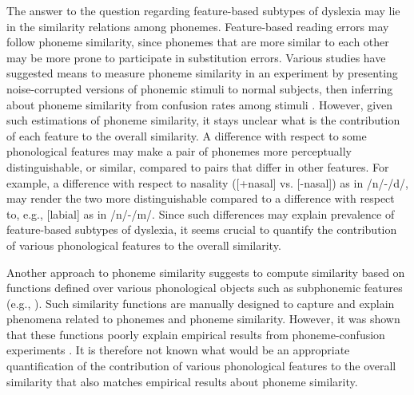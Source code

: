 The answer to the question regarding feature-based subtypes of dyslexia may lie in the similarity relations among phonemes. Feature-based reading errors may follow phoneme similarity, since phonemes that are more similar to each other may be more prone to participate in substitution errors. Various studies have suggested means to measure phoneme similarity in an experiment \citep{NicelyMiller1955, Luce1987, cutler2004patterns} by presenting noise-corrupted versions of phonemic stimuli to normal subjects, then inferring about phoneme similarity from confusion rates among stimuli \citep{Tversky1977}. However, given such estimations of phoneme similarity, it stays unclear what is the contribution of each feature to the overall similarity. A difference with respect to some phonological features may make a pair of phonemes more perceptually distinguishable, or similar, compared to pairs that differ in other features. For example, a difference with respect to nasality ([+nasal] vs. [-nasal]) as in /n/-/d/, may render the two more distinguishable compared to a difference with respect to, e.g., [labial] as in /n/-/m/. Since such differences may explain prevalence of feature-based subtypes of dyslexia, it seems crucial to quantify the contribution of various phonological features to the overall similarity.

Another approach to phoneme similarity suggests to compute similarity based on functions defined over various phonological objects such as subphonemic features (e.g., \citealp{Pierrehumbert1993, Frisch1997}). Such similarity functions are manually designed to capture and explain phenomena related to phonemes and phoneme similarity. However, it was shown that these functions poorly explain empirical results from phoneme-confusion experiments \citep{Bailey2005}. It is therefore not known what would be an appropriate quantification of the contribution of various phonological features to the overall similarity that also matches empirical results about phoneme similarity. 

